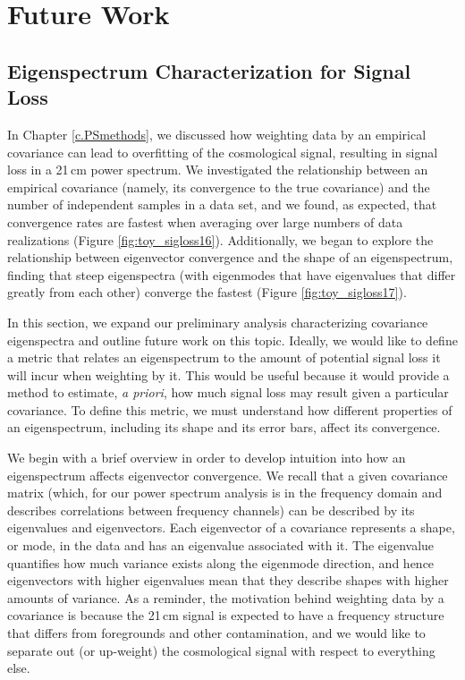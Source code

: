 \chapter{Future Work}
\label{c.future}

\section{Eigenspectrum Characterization for Signal Loss}

In Chapter \ref{c.PSmethods}, we discussed how weighting data by an empirical covariance can lead to overfitting of the cosmological signal, resulting in signal loss in a 21\,cm power spectrum. We investigated the relationship between an empirical covariance (namely, its convergence to the true covariance) and the number of independent samples in a data set, and we found, as expected, that convergence rates are fastest when averaging over large numbers of data realizations (Figure \ref{fig:toy_sigloss16}). Additionally, we began to explore the relationship between eigenvector convergence and the shape of an eigenspectrum, finding that steep eigenspectra (with eigenmodes that have eigenvalues that differ greatly from each other) converge the fastest (Figure \ref{fig:toy_sigloss17}).

In this section, we expand our preliminary analysis characterizing covariance eigenspectra and outline future work on this topic. Ideally, we would like to define a metric that relates an eigenspectrum to the amount of potential signal loss it will incur when weighting by it. This would be useful because it would provide a method to estimate, \textit{a priori}, how much signal loss may result given a particular covariance. To define this metric, we must understand how different properties of an eigenspectrum, including its shape and its error bars, affect its convergence. 

We begin with a brief overview in order to develop intuition into how an eigenspectrum affects eigenvector convergence. We recall that a given covariance matrix (which, for our power spectrum analysis is in the frequency domain and describes correlations between frequency channels) can be described by its eigenvalues and eigenvectors. Each eigenvector of a covariance represents a shape, or mode, in the data and has an eigenvalue associated with it. The eigenvalue quantifies how much variance exists along the eigenmode direction, and hence eigenvectors with higher eigenvalues mean that they describe shapes with higher amounts of variance. As a reminder, the motivation behind weighting data by a covariance is because the 21\,cm signal is expected to have a frequency structure that differs from foregrounds and other contamination, and we would like to separate out (or up-weight) the cosmological signal with respect to everything else.

